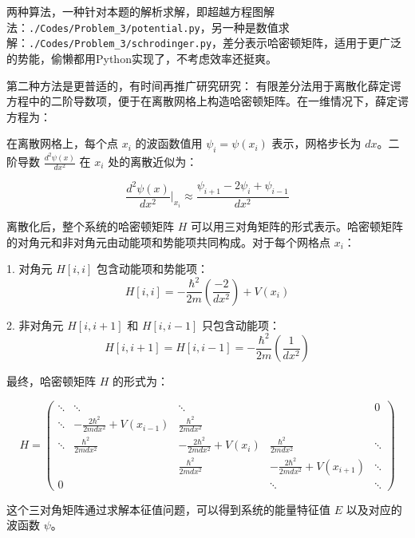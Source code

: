 两种算法，一种针对本题的解析求解，即超越方程图解法：\texttt{./Codes/Problem_3/potential.py}，另一种是数值求解：\texttt{./Codes/Problem_3/schrodinger.py}，差分表示哈密顿矩阵，适用于更广泛的势能，偷懒都用Python实现了，不考虑效率还挺爽。

第二种方法是更普适的，有时间再推广研究研究：
有限差分法用于离散化薛定谔方程中的二阶导数项，便于在离散网格上构造哈密顿矩阵。在一维情况下，薛定谔方程为：


在离散网格上，每个点 \(x_i\) 的波函数值用 \(\psi_i = \psi(x_i)\) 表示，网格步长为 \(dx\)。二阶导数 \(\frac{d^2 \psi(x)}{dx^2}\) 在 \(x_i\) 处的离散近似为：

\[
    \frac{d^2 \psi(x)}{dx^2} \Big|_{x_i} \approx \frac{\psi_{i+1} - 2\psi_i + \psi_{i-1}}{dx^2}
\]

离散化后，整个系统的哈密顿矩阵 \(H\) 可以用三对角矩阵的形式表示。哈密顿矩阵的对角元和非对角元由动能项和势能项共同构成。对于每个网格点 \(x_i\)：

1. 对角元 \(H[i, i]\) 包含动能项和势能项：
\[
    H[i, i] = -\frac{\hbar^2}{2m} \left( \frac{-2}{dx^2} \right) + V(x_i)
\]

2. 非对角元 \(H[i, i+1]\) 和 \(H[i, i-1]\) 只包含动能项：
\[
    H[i, i+1] = H[i, i-1] = -\frac{\hbar^2}{2m} \left( \frac{1}{dx^2} \right)
\]

最终，哈密顿矩阵 \(H\) 的形式为：

\[
    H = \begin{pmatrix}
        \ddots & \ddots                                  & \ddots                              &                                         & 0      \\
        \ddots & -\frac{2 \hbar^2}{2m dx^2} + V(x_{i-1}) & \frac{\hbar^2}{2m dx^2}             &                                         &        \\
        \ddots & \frac{\hbar^2}{2m dx^2}                 & -\frac{2 \hbar^2}{2m dx^2} + V(x_i) & \frac{\hbar^2}{2m dx^2}                 & \ddots \\
               &                                         & \frac{\hbar^2}{2m dx^2}             & -\frac{2 \hbar^2}{2m dx^2} + V(x_{i+1}) & \ddots \\
        0      &                                         &                                     & \ddots                                  & \ddots
    \end{pmatrix}
\]

这个三对角矩阵通过求解本征值问题，可以得到系统的能量特征值 \(E\) 以及对应的波函数 \(\psi\)。

